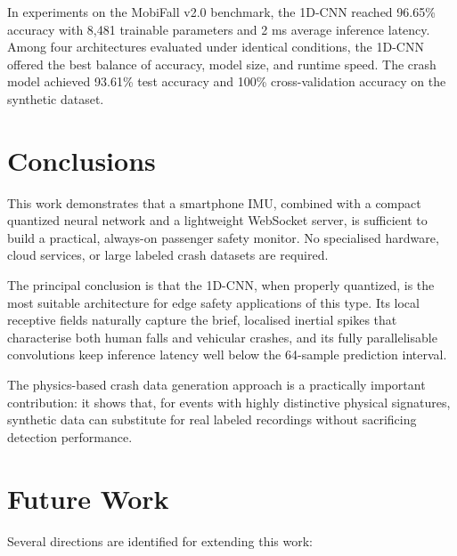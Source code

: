 In experiments on the MobiFall v2.0 benchmark, the 1D-CNN reached 96.65\% accuracy with 8,481 trainable parameters and 2 ms average inference latency. Among four architectures evaluated under identical conditions, the 1D-CNN offered the best balance of accuracy, model size, and runtime speed. The crash model achieved 93.61\% test accuracy and 100\% cross-validation accuracy on the synthetic dataset.

\section{Conclusions}
\label{sec:conclusions}

This work demonstrates that a smartphone IMU, combined with a compact quantized neural network and a lightweight WebSocket server, is sufficient to build a practical, always-on passenger safety monitor. No specialised hardware, cloud services, or large labeled crash datasets are required.

The principal conclusion is that the 1D-CNN, when properly quantized, is the most suitable architecture for edge safety applications of this type. Its local receptive fields naturally capture the brief, localised inertial spikes that characterise both human falls and vehicular crashes, and its fully parallelisable convolutions keep inference latency well below the 64-sample prediction interval.

The physics-based crash data generation approach is a practically important contribution: it shows that, for events with highly distinctive physical signatures, synthetic data can substitute for real labeled recordings without sacrificing detection performance.

\section{Future Work}
\label{sec:future}

Several directions are identified for extending this work:

